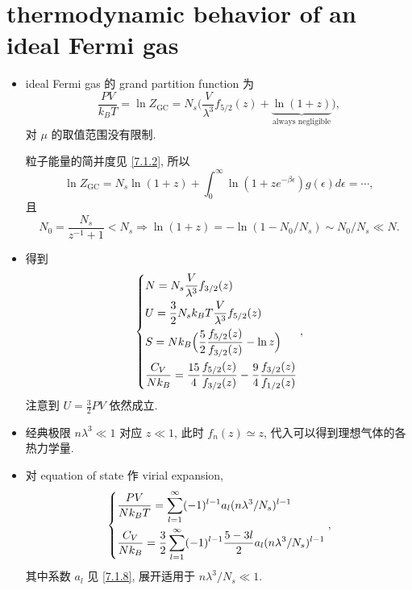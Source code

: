 \section{thermodynamic behavior of an ideal Fermi gas}
\begin{itemize}
	\item ideal Fermi gas 的 grand partition function 为
	\begin{equation}
		\frac{P V}{k_B T} = \ln Z_\text{GC} = N_s \Big( \frac{V}{\lambda^3} f_{5 / 2}(z) + \underbrace{\ln(1 + z)}_{\text{always negligible}} \Big),
	\end{equation}
	对 $\mu$ 的取值范围没有限制.
	
	\begin{tcolorbox}[title=calculation:]
		粒子能量的简并度见 \eqref{7.1.2}, 所以
		\begin{equation}
			\ln Z_\text{GC} = N_s \ln(1 + z) + \int_0^\infty \ln(1 + z e^{- \beta \epsilon}) g(\epsilon) d\epsilon = \cdots,
		\end{equation}
		且
		\begin{equation}
			N_0 = \frac{N_s}{z^{- 1} + 1} < N_s \Longrightarrow \ln(1 + z) = - \ln(1 - N_0 / N_s) \sim N_0 / N_s \ll N.
		\end{equation}
	\end{tcolorbox}
	
	\item 得到
	\begin{equation}
		\begin{dcases}
			N = N_s \frac{V}{\lambda^3} f_{3 / 2}(z) \\
			U = \frac{3}{2} N_s k_B T \frac{V}{\lambda^3} f_{5 / 2}(z) \\
			S = N k_B \Big( \frac{5}{2} \frac{f_{5 / 2}(z)}{f_{3 / 2}(z)} - \ln z \Big) \\
			\frac{C_V}{N k_B} = \frac{15}{4} \frac{f_{5 / 2}(z)}{f_{3 / 2}(z)} - \frac{9}{4} \frac{f_{3 / 2}(z)}{f_{1 / 2}(z)}
		\end{dcases},
	\end{equation}
	注意到 $U = \frac{3}{2} P V$ 依然成立.
	
	\item 经典极限 $n \lambda^3 \ll 1$ 对应 $z \ll 1$, 此时 $f_n(z) \simeq z$, 代入可以得到理想气体的各热力学量.
	
	\item 对 equation of state 作 virial expansion,
	\begin{equation}
		\begin{dcases}
			\frac{P V}{N k_B T} = \sum_{l = 1}^\infty (- 1)^{l - 1} a_l (n \lambda^3 / N_s)^{l - 1} \\
			\frac{C_V}{N k_B} = \frac{3}{2} \sum_{l = 1}^\infty (- 1)^{l - 1} \frac{5 - 3 l}{2} a_l (n \lambda^3 / N_s)^{l - 1}
		\end{dcases},
	\end{equation}
	其中系数 $a_l$ 见 \eqref{7.1.8}, 展开适用于 $n \lambda^3 / N_s \ll 1$.
\end{itemize}

